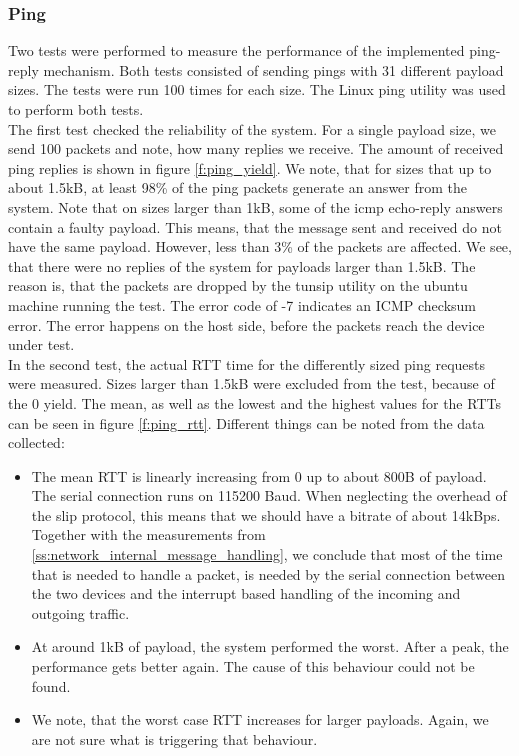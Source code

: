 \subsubsection{Ping \label{ss:network_performance_ping}}
Two tests were performed to measure the performance of the implemented ping-reply mechanism. Both tests consisted of sending pings with 31 different payload sizes. The tests were run 100 times for each size. The Linux ping utility was used to perform both tests.\\
The first test checked the reliability of the system. For a single payload size, we send 100 packets and note, how many replies we receive. The amount of received ping replies is shown in figure \ref{f:ping_yield}. We note, that for sizes that up to about 1.5kB, at least 98\% of the ping packets generate an answer from the system. Note that on sizes larger than 1kB, some of the icmp echo-reply answers contain a faulty payload. This means, that the message sent and received do not have the same payload. However, less than 3\% of the packets are affected. We see, that there were no replies of the system for payloads larger than 1.5kB. The reason is, that the packets are dropped by the tunsip utility on the ubuntu machine running the test. The error code of -7 indicates an ICMP checksum error. The error happens on the host side, before the packets reach the device under test.\\
In the second test, the actual RTT time for the differently sized ping requests were measured. Sizes larger than 1.5kB were excluded from the test, because of the 0 yield. The mean, as well as the lowest and the highest values for the RTTs can be seen in figure \ref{f:ping_rtt}. Different things can be noted from the data collected: 
\begin{itemize}
	\item The mean RTT is linearly increasing from 0 up to about 800B of payload. The serial connection runs on 115200 Baud. When neglecting the overhead of the slip protocol, this means that we should have a bitrate of about 14kBps. Together with the measurements from \ref{ss:network_internal_message_handling}, we conclude that most of the time that is needed to handle a packet, is needed by the serial connection between the two devices and the interrupt based handling of the incoming and outgoing traffic.
	\item At around 1kB of payload, the system performed the worst. After a peak, the performance gets better again. The cause of this behaviour could not be found.
	\item We note, that the worst case RTT increases for larger payloads. Again, we are not sure what is triggering that behaviour.
\end{itemize}

